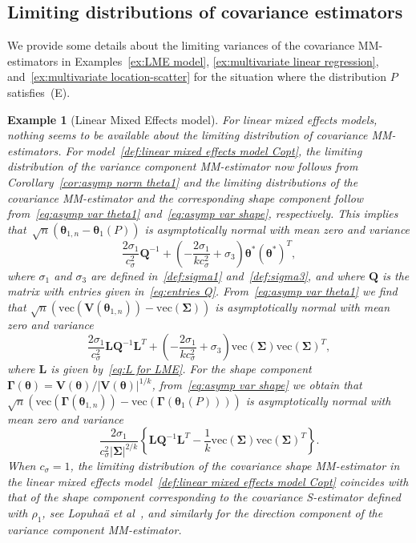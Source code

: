 \documentclass{article}
\numberwithin{equation}{section}
\theoremstyle{plain}
\newtheorem{example}{Example}
\newcommand{\vc}{\mathrm{vec}}
\newcommand{\btheta}{\bm\theta}
\newcommand{\bSigma}{\mathbf{\Sigma}}
\newcommand{\bGamma}{\bm\Gamma}
\newcommand{\bV}{\mathbf{V}}
\newcommand{\bL}{\mathbf{L}}
\newcommand{\bQ}{\mathbf{Q}}
\begin{document}
\subsection{Limiting distributions of covariance estimators}
We provide some details about the limiting variances of the covariance MM-estimators
in Examples~\ref{ex:LME model}, \ref{ex:multivariate linear regression}, and~\ref{ex:multivariate location-scatter}
for the situation where the distribution $P$ satisfies~(E).
\setcounter{example}{0}
\begin{example}[Linear Mixed Effects model]
\label{ex:asymp distr LME}
For linear mixed effects models, 
nothing seems to be available about the limiting distribution of covariance MM-estimators.
For model~\eqref{def:linear mixed effects model Copt}, the limiting distribution of the 
variance component MM-estimator now follows from Corollary~\ref{cor:asymp norm theta1} and
the limiting distributions of the covariance MM-estimator
and the corresponding shape component follow from~\eqref{eq:asymp var theta1}
and~\eqref{eq:asymp var shape}, respectively.
This implies that~$\sqrt{n}(\btheta_{1,n}-\btheta_1(P))$ is asymptotically normal with mean zero and variance
\[
\frac{2\sigma_1}{c_\sigma^2}
\bQ^{-1}
+
\left(
-\frac{2\sigma_1}{kc_\sigma^2}
+
\sigma_3
\right)
\btheta^*(\btheta^*)^T,
\]
where $\sigma_1$ and $\sigma_3$ are defined in~\eqref{def:sigma1} and~\eqref{def:sigma3},
and where $\bQ$ is the matrix with entries given in~\eqref{eq:entries Q}. 
From~\eqref{eq:asymp var theta1} we find that 
$\sqrt{n}(\vc(\bV(\btheta_{1,n}))-\vc(\bSigma))$ is asymptotically normal with 
mean zero and variance
\[
\frac{2\sigma_1}{c_\sigma^2}
\bL\bQ^{-1}\bL^T
+
\left(
-\frac{2\sigma_1}{kc_\sigma^2}
+
\sigma_3
\right)
\vc(\bSigma)
\vc(\bSigma)^T,
\]
where $\bL$ is given by~\eqref{eq:L for LME}.
For the shape component $\bGamma(\btheta)=\bV(\btheta)/|\bV(\btheta)|^{1/k}$,
from~\eqref{eq:asymp var shape} we obtain that 
$\sqrt{n}(\vc(\bGamma(\btheta_{1,n}))-\vc(\bGamma(\btheta_1(P))))$
is asymptotically normal with mean zero and variance
\[
\frac{2\sigma_1}{c_\sigma^2|\bSigma|^{2/k}}
\left\{
\bL\bQ^{-1}\bL^T
-
\frac{1}{k}
\vc(\bSigma)
\vc(\bSigma)^T
\right\}.
\]
When $c_\sigma=1$, the limiting distribution
of the covariance shape MM-estimator in the linear mixed effects model~\eqref{def:linear mixed effects model Copt} 
coincides with that of the shape component corresponding to the covariance S-estimator defined with $\rho_1$,
see Lopuha\"a \emph{et al}~\cite{lopuhaa-gares-ruizgazen2023},
and similarly for the direction component of the variance component MM-estimator.
\end{example}
\end{document}

